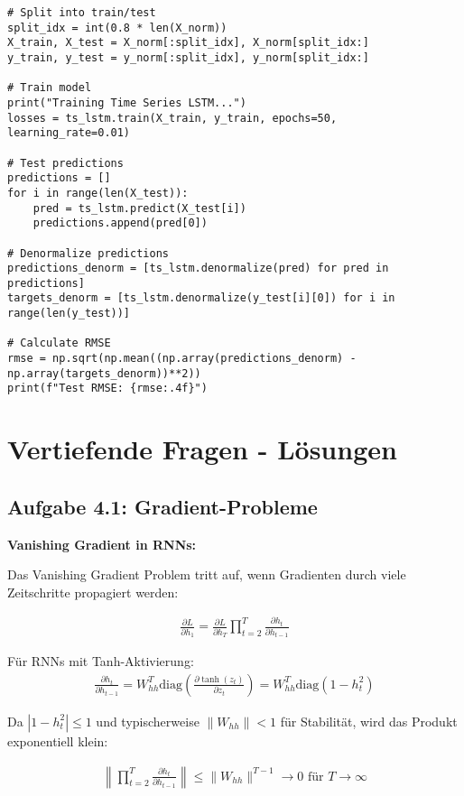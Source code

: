 ﻿\documentclass[12pt,a4paper]{article}
\begin{document}
\begin{lstlisting}
# Split into train/test
split_idx = int(0.8 * len(X_norm))
X_train, X_test = X_norm[:split_idx], X_norm[split_idx:]
y_train, y_test = y_norm[:split_idx], y_norm[split_idx:]

# Train model
print("Training Time Series LSTM...")
losses = ts_lstm.train(X_train, y_train, epochs=50, learning_rate=0.01)

# Test predictions
predictions = []
for i in range(len(X_test)):
    pred = ts_lstm.predict(X_test[i])
    predictions.append(pred[0])

# Denormalize predictions
predictions_denorm = [ts_lstm.denormalize(pred) for pred in predictions]
targets_denorm = [ts_lstm.denormalize(y_test[i][0]) for i in range(len(y_test))]

# Calculate RMSE
rmse = np.sqrt(np.mean((np.array(predictions_denorm) - np.array(targets_denorm))**2))
print(f"Test RMSE: {rmse:.4f}")
\end{lstlisting}

\section{Vertiefende Fragen - Lösungen}

\subsection{Aufgabe 4.1: Gradient-Probleme}

\textbf{Vanishing Gradient in RNNs:}

Das Vanishing Gradient Problem tritt auf, wenn Gradienten durch viele Zeitschritte propagiert werden:

\begin{align}
\frac{\partial L}{\partial h_1} = \frac{\partial L}{\partial h_T} \prod_{t=2}^T \frac{\partial h_t}{\partial h_{t-1}}
\end{align}

Für RNNs mit Tanh-Aktivierung:
\begin{align}
\frac{\partial h_t}{\partial h_{t-1}} = W_{hh}^T \text{diag}(\frac{\partial \tanh(z_t)}{\partial z_t}) = W_{hh}^T \text{diag}(1 - h_t^2)
\end{align}

Da $|1 - h_t^2| \leq 1$ und typischerweise $\|W_{hh}\| < 1$ für Stabilität, wird das Produkt exponentiell klein:

\begin{align}
\left\|\prod_{t=2}^T \frac{\partial h_t}{\partial h_{t-1}}\right\| \leq \|W_{hh}\|^{T-1} \to 0 \text{ für } T \to \infty
\end{align}
\end{document}
